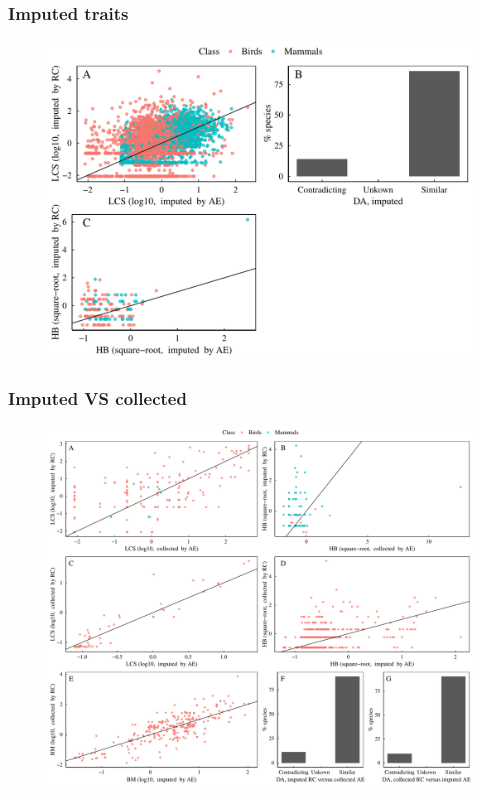 \subsubsection{Imputed traits}
\begin{figure}[h!]
\centering
\includegraphics[scale=0.7]{figures/chapter2/Comparison_with_RCooke/Comparison_imputed.pdf}
\caption[]{}
\label{ComparisonRC_imputed}
\end{figure}


\subsubsection{Imputed VS collected}
\begin{figure}[h!]
\centering
\includegraphics[scale=0.5]{figures/chapter2/Comparison_with_RCooke/Comparison_imputed_VS_collected.pdf}
\caption[]{}
\label{ComparisonRC_VS}
\end{figure}


